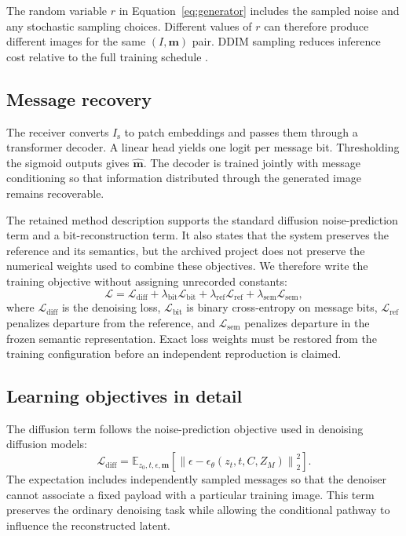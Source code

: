 \documentclass[pdflatex,sn-mathphys-num]{sn-jnl}
\newcommand{\stego}{I_{\mathrm{s}}}
\newcommand{\msg}{\mathbf{m}}
\newcommand{\mhat}{\widehat{\mathbf{m}}}
\begin{document}
The random variable $r$ in Equation~\eqref{eq:generator} includes the sampled noise and any stochastic sampling choices. Different values of $r$ can therefore produce different images for the same $(I,\msg)$ pair. DDIM sampling reduces inference cost relative to the full training schedule \cite{song2021ddim}.

\subsection{Message recovery}

The receiver converts $\stego$ to patch embeddings and passes them through a transformer decoder. A linear head yields one logit per message bit. Thresholding the sigmoid outputs gives $\mhat$. The decoder is trained jointly with message conditioning so that information distributed through the generated image remains recoverable.

The retained method description supports the standard diffusion noise-prediction term and a bit-reconstruction term. It also states that the system preserves the reference and its semantics, but the archived project does not preserve the numerical weights used to combine these objectives. We therefore write the training objective without assigning unrecorded constants:
\begin{equation}
\mathcal{L}=
\mathcal{L}_{\mathrm{diff}}
+\lambda_{\mathrm{bit}}\mathcal{L}_{\mathrm{bit}}
+\lambda_{\mathrm{ref}}\mathcal{L}_{\mathrm{ref}}
+\lambda_{\mathrm{sem}}\mathcal{L}_{\mathrm{sem}},
\label{eq:objective}
\end{equation}
where $\mathcal{L}_{\mathrm{diff}}$ is the denoising loss, $\mathcal{L}_{\mathrm{bit}}$ is binary cross-entropy on message bits, $\mathcal{L}_{\mathrm{ref}}$ penalizes departure from the reference, and $\mathcal{L}_{\mathrm{sem}}$ penalizes departure in the frozen semantic representation. Exact loss weights must be restored from the training configuration before an independent reproduction is claimed.

\subsection{Learning objectives in detail}

The diffusion term follows the noise-prediction objective used in denoising diffusion models:
\begin{equation}
\mathcal{L}_{\mathrm{diff}}
=\mathbb{E}_{z_0,t,\epsilon,\msg}
\left[
\left\|\epsilon-
\epsilon_{\theta}(z_t,t,C,Z_M)\right\|_2^2
\right].
\label{eq:diffusionloss}
\end{equation}
The expectation includes independently sampled messages so that the denoiser cannot associate a fixed payload with a particular training image. This term preserves the ordinary denoising task while allowing the conditional pathway to influence the reconstructed latent.
\end{document}
